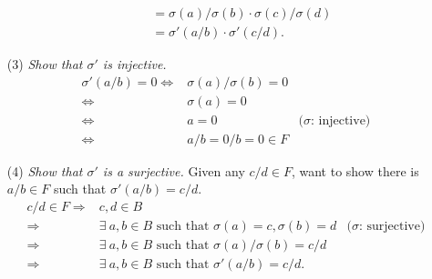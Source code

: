 \documentclass{article}
\begin{document}
\begin{enumerate}
\begin{enumerate}
\begin{align*}
  &= \sigma(a)/\sigma(b) \cdot \sigma(c)/\sigma(d) \\
  &= \sigma'(a/b) \cdot \sigma'(c/d).
  \end{align*}
  \end{enumerate}
\item[(3)]
\emph{Show that $\sigma'$ is injective.}
  \begin{align*}
  \sigma'(a/b) = 0
  \Longleftrightarrow&
  \sigma(a)/\sigma(b) = 0 \\
  \Longleftrightarrow&
  \sigma(a) = 0 \\
  \Longleftrightarrow&
   a = 0
    &\text{($\sigma$: injective)} \\
  \Longleftrightarrow&
  a/b = 0/b = 0 \in F
  \end{align*}
\item[(4)]
\emph{Show that $\sigma'$ is a surjective.}
Given any $c/d \in F$, want to show there is $a/b \in F$ such that $\sigma'(a/b) = c/d$.
  \begin{align*}
  c/d \in F
  \Longrightarrow&
  c, d \in B \\
  \Longrightarrow&
  \exists \: a, b \in B \text{ such that } \sigma(a)=c, \sigma(b)=d
    &\text{($\sigma$: surjective)} \\
  \Longrightarrow&
  \exists \: a, b \in B \text{ such that } \sigma(a) / \sigma(b) = c / d \\
  \Longrightarrow&
  \exists \: a, b \in B \text{ such that } \sigma'(a/b) = c/d.
  \end{align*}
\end{enumerate}



\end{document}
